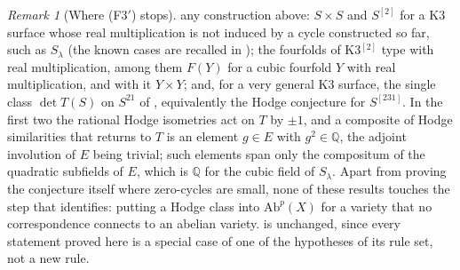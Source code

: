 \documentclass[11pt,reqno]{amsart}
\theoremstyle{plain}
\theoremstyle{definition}
\theoremstyle{remark}
\newtheorem{remark}[theorem]{Remark}
\newcommand{\QQ}{\mathbb{Q}}
\begin{document}
\begin{remark}[Where \textup{(F3$'$)} stops]
any construction above: $S\times S$ and $S^{[2]}$ for a K3 surface
whose real multiplication is not induced by a cycle constructed so far, such
as $S_{\lambda}$
(the known cases are recalled in ); the fourfolds of
K3$^{[2]}$ type with real multiplication, among them $F(Y)$ for a cubic
fourfold $Y$ with real multiplication, and with it $Y\times Y$; and, for a
very general K3 surface, the single class $\det T(S)$ on $S^{21}$ of
, equivalently the Hodge conjecture for $S^{[231]}$.
In the first two the
rational Hodge isometries \cite{Bus19,Mar24} act on $T$ by $\pm1$, and a
composite of Hodge similarities that returns to $T$ is an element $g\in E$
with $g^{2}\in\QQ$, the adjoint involution of $E$ being trivial; such
elements span only the compositum of the quadratic subfields of $E$, which is
$\QQ$ for the cubic field of $S_{\lambda}$. Apart from proving the
conjecture itself where zero-cycles are small, none of these results touches
the step that
 identifies: putting a Hodge class into
$\mathrm{Ab}^{p}(X)$ for a variety that no correspondence connects to an
abelian variety.  is unchanged, since every statement
proved here is a special case of one of the hypotheses of its rule set, not a
new rule.
\end{remark}
\end{document}

